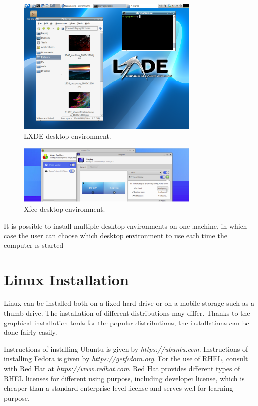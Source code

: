 \begin{figure}[htbp]
	\centering
	\includegraphics[width=250pt]{chapters/part-1/figures/lxde_demo.png}
	\caption{LXDE desktop environment.} \label{ch:bitl:fig:lxdedemo}
\end{figure}

\begin{figure}[htbp]
	\centering
	\includegraphics[width=250pt]{chapters/part-1/figures/xfce_demo.png}
	\caption{Xfce desktop environment.} \label{ch:bitl:fig:xfcedemo}
\end{figure}

It is possible to install multiple desktop environments on one machine, in which case the user can choose which desktop environment to use each time the computer is started.

\section{Linux Installation}

Linux can be installed both on a fixed hard drive or on a mobile storage such as a thumb drive. The installation of different distributions may differ. Thanks to the graphical installation tools for the popular distributions, the installations can be done fairly easily.

Instructions of installing Ubuntu is given by \textit{https://ubuntu.com}. Instructions of installing Fedora is given by \textit{https://getfedora.org}. For the use of RHEL, consult with Red Hat at \textit{https://www.redhat.com}. Red Hat provides different types of RHEL licenses for different using purpose, including developer license, which is cheaper than a standard enterprise-level license and serves well for learning purpose.
